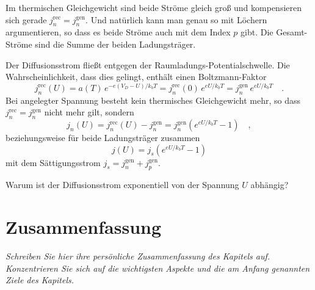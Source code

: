 Im thermischen Gleichgewicht sind beide Ströme gleich groß und kompensieren sich gerade $j_n^\text{rec} = j_n^\text{gen}$. Und natürlich kann man genau so mit Löchern argumentieren, so dass es beide Ströme auch mit dem Index $p$ gibt. Die Gesamt-Ströme sind die Summe der beiden Ladungsträger.

Der Diffusionsstrom fließt entgegen der Raumladungs-Potentialschwelle. Die Wahrscheinlichkeit, dass dies gelingt, enthält einen Boltzmann-Faktor
\begin{equation}
    j_n^\text{rec}(U) = a(T) \, e^{-e (V_D - U) / k_b T} =  j_n^\text{rec}(0) \, e^{e U / k_b T}
    = j_n^\text{gen} \, e^{e U / k_b T}
    \quad .
\end{equation}
Bei angelegter Spannung besteht kein thermisches Gleichgewicht mehr, so dass $j_n^\text{rec} = j_n^\text{gen}$ nicht mehr gilt, sondern
\begin{equation}
    j_n(U) = j_n^\text{rec}(U) - j_n^\text{gen} = j_n^\text{gen} \left(  e^{e U / k_b T} - 1 \right) \quad ,
\end{equation}
beziehungsweise für beide Ladungsträger zusammen 
\begin{equation}
    j(U) =  j_s \left(  e^{e U / k_b T} - 1 \right)
\end{equation}
mit dem Sättigungsstrom $j_s = j_n^\text{gen}  + j_p^\text{gen} $.

\begin{questions}
    \item Warum ist der Diffusionsstrom exponentiell von der Spannung $U$ abhängig?
\end{questions}


\section{Zusammenfassung}

\textit{Schreiben Sie hier ihre persönliche Zusammenfassung des Kapitels auf. Konzentrieren Sie sich auf die wichtigsten Aspekte und die am Anfang genannten Ziele des Kapitels.}

\vspace*{10cm}

\printbibliography[segment=\therefsegment,heading=subbibliography]
